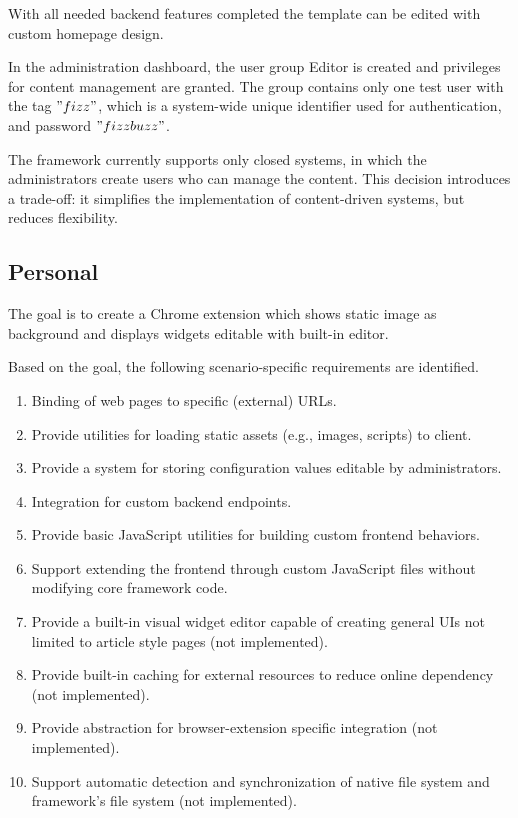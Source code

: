 With all needed backend features completed the template can be edited with custom homepage design.

In the administration dashboard, the user group Editor is created and privileges for content management are granted.
The group contains only one test user with the tag \("fizz"\),
which is a system-wide unique identifier used for authentication, and password \("fizzbuzz"\).

The framework currently supports only closed systems, in which the administrators create users who can manage the content.
This decision introduces a trade-off: it simplifies the implementation of content-driven systems, but reduces flexibility.

\subsection{Personal}\label{subsec:personal}
The goal is to create a Chrome extension which shows static image as background and displays widgets editable with built-in editor.

Based on the goal, the following scenario-specific requirements are identified.

\begin{enumerate}
    \item Binding of web pages to specific (external) URLs.
    \item Provide utilities for loading static assets (e.g., images, scripts) to client.
    \item Provide a system for storing configuration values editable by administrators.
    \item Integration for custom backend endpoints.
    \item Provide basic JavaScript utilities for building custom frontend behaviors.
    \item Support extending the frontend through custom JavaScript files without modifying core framework code.
    \item Provide a built-in visual widget editor capable of creating general UIs not limited to article style pages (not implemented).
    \item Provide built-in caching for external resources to reduce online dependency (not implemented).
    \item Provide abstraction for browser-extension specific integration (not implemented).
    \item Support automatic detection and synchronization of native file system and framework's file system (not implemented).
\end{enumerate}

